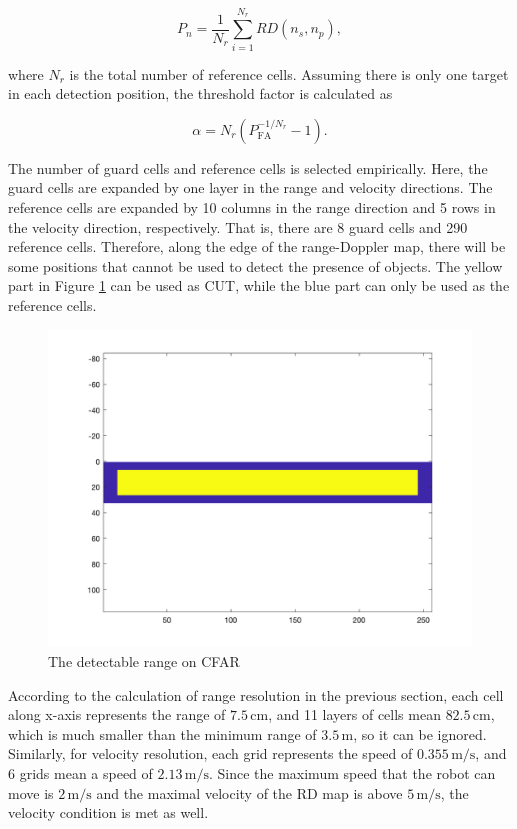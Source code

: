\documentclass[12pt,DIV14,BCOR12mm,a4paper,footinclude=false,headinclude,parskip=half-,twoside,openright,cleardoublepage=empty,toc=index,bibliography=totoc,listof=totoc]{scrreprt}
\numberwithin{equation}{chapter}
\begin{document}
\begin{equation}
P_n = \frac{1}{N_r} \sum_{i=1}^{N_r} RD(n_s, n_p),
\end{equation}

where $N_r$ is the total number of reference cells. Assuming there is only one target in each detection position, the threshold factor \cite{cfar_calculation} is calculated as

\begin{equation}
\alpha = N_r \left( P_{\text{FA}}^{-1/N_r} - 1 \right).
\end{equation}

The number of guard cells and reference cells is selected empirically. Here, the guard cells are expanded by one layer in the range and velocity directions. The reference cells are expanded by 10 columns in the range direction and 5 rows in the velocity direction, respectively. That is, there are 8 guard cells and 290 reference cells. Therefore, along the edge of the range-Doppler map, there will be some positions that cannot be used to detect the presence of objects. The yellow part in Figure \ref{cfar_range} can be used as CUT, while the blue part can only be used as the reference cells.

\begin{figure}[t]
	\centering
	\includegraphics[scale=.2]{figures/cfar_range.png}
	\caption{The detectable range on CFAR}
	\label{cfar_range}
\end{figure}

According to the calculation of range resolution in the previous section, each cell along x-axis represents the range of $7.5\,\mathrm{cm}$, and 11 layers of cells mean $82.5\,\mathrm{cm}$, which is much smaller than the minimum range of $3.5\,\mathrm{m}$, so it can be ignored. Similarly, for velocity resolution, each grid represents the speed of $0.355\,\mathrm{m/s}$, and 6 grids mean a speed of $2.13\,\mathrm{m/s}$. Since the maximum speed that the robot can move is $2\,\mathrm{m/s}$ and the maximal velocity of the RD map is above $5\,\mathrm{m/s}$, the velocity condition is met as well.
\end{document}
